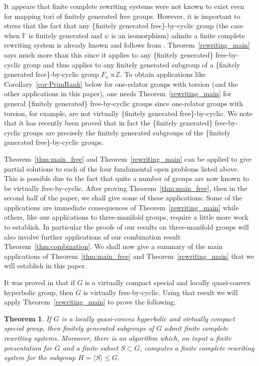 \documentclass[12pt, a4paper]{amsart}
\newcommand{\F}{\mathbb{F}}
\newtheorem{theorem}{Theorem}[section]
\theoremstyle{definition}
\newcommand{\Z}{\mathbb{Z}}
\begin{document}
It appears that finite complete rewriting systems were not known to exist even for mapping tori of finitely generated free groups. However, it is important to stress that the fact that any \{finitely generated free\}-by-cyclic group (the case when $\F$ is finitely generated and $\psi$ is an isomorphism) admits a finite complete rewriting system is already known and follows from \cite[p286]{Groves1993}. Theorem~\ref{rewriting_main} says much more than this since it applies to any \{finitely generated\} free-by-cyclic group and thus applies to any finitely generated subgroup of a  \{finitely generated free\}-by-cyclic group $F_n \rtimes \Z$. To obtain applications like Corollary~\ref{cor:PrimRank} below for one-relator groups with torsion (and the other applications in this paper), one needs Theorem~\ref{rewriting_main} for general \{finitely generated\} free-by-cyclic groups since one-relator groups with torsion, for example, are not virtually \{finitely generated free\}-by-cyclic. We note that it has recently been proved \cite{Li26} that in fact the \{finitely generated\} free-by-cyclic groups are precisely the finitely generated subgroups of the \{finitely generated free\}-by-cyclic groups.


Theorem~\ref{thm:main_free} and Theorem~\ref{rewriting_main} can be applied to give partial solutions to each of the four fundamental open problems listed above. This is possible due to the fact that quite a number of groups are now known to be virtually free-by-cyclic.  After proving Theorem~\ref{thm:main_free}, then in the second half of the paper, we shall give some of these applications. Some of the applications are immediate consequences of Theorem~\ref{rewriting_main} while others, like our applications to three-manifold groups, require a little more work to establish. In particular the proofs of our results on three-manifold groups will also involve further applications of our combination result Theorem~\ref{thm:combination}. We shall now give a summary of the main applications of Theorem~\ref{thm:main_free} and Theorem~\ref{rewriting_main} that we will establish in this paper. 

It was proved in \cite[Theorem A.2]{fisher2026coherent}
that if $G$ is a virtually compact special and locally quasi-convex hyperbolic group, then $G$ is virtually free-by-cyclic. Using that result we will apply Theorem~\ref{rewriting_main} to prove the following.  

\begin{theorem}\label{thm:locallyQuasConv}
If $G$ is a locally quasi-convex hyperbolic and virtually compact special group, then finitely generated subgroups of $G$ admit finite complete rewriting systems. Moreover, there is an algorithm which, on input a finite presentation for $G$ and a finite subset $S\subset G$, computes a finite complete rewriting system for the subgroup $H = \langle S\rangle\leqslant G$.
\end{theorem}
\end{document}
